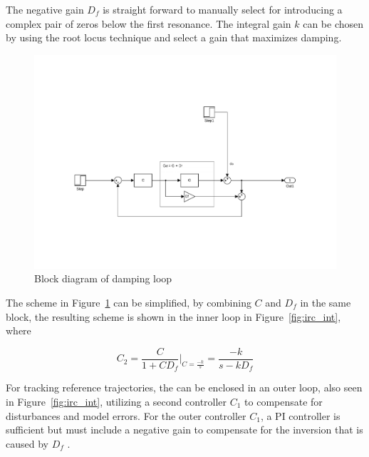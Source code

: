 The negative gain $D_f$ is straight forward to manually select for introducing a complex pair of zeros below the first resonance. The integral gain $k$ can be chosen by using the root locus technique and select a gain that maximizes damping.

\begin{figure}[h]
  \centering %
  \includegraphics[width=1\textwidth, trim=5.5cm 3cm 5.1cm 9.5cm, clip=true]{fig/matlab/irc}
  \caption{\label{fig:irc}Block diagram of \abbrIRC damping loop}
\end{figure}

The \abbrIRC scheme in Figure~\ref{fig:irc} can be simplified, by combining $C$ and $D_f$ in the same block, the resulting scheme is shown in the inner loop in Figure~\ref{fig:irc_int}, where

\begin{equation}
  \label{eq:C2}
  C_2 = \frac{C}{1+CD_f}\Bigg|_{C = \frac{-k}{s}} = \frac{-k}{s - kD_f}
\end{equation}

For tracking reference trajectories, the \abbrIRC can be enclosed in an outer loop, also seen in Figure~\ref{fig:irc_int}, utilizing a second controller $C_1$ to compensate for disturbances and model errors. For the outer controller $C_1$, a PI controller is sufficient but must include a negative gain to compensate for the inversion that is caused by $D_f$ \citep{gu:2014}.

